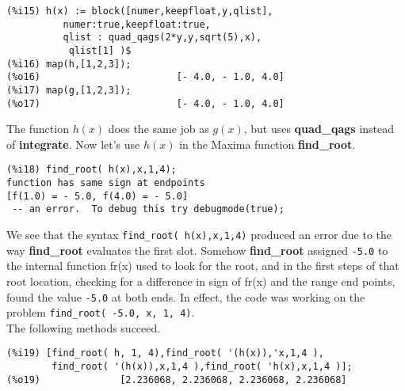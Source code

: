 \documentclass[12pt]{article}
\begin{document}
\small
\begin{verbatim}
(%i15) h(x) := block([numer,keepfloat,y,qlist],
          numer:true,keepfloat:true,
          qlist : quad_qags(2*y,y,sqrt(5),x),
           qlist[1] )$
(%i16) map(h,[1,2,3]);
(%o16)                        [- 4.0, - 1.0, 4.0]
(%i17) map(g,[1,2,3]);
(%o17)                        [- 4.0, - 1.0, 4.0]
\end{verbatim}
\normalsize
The function $h(x)$ does the same job as $g(x)$, but uses \textbf{quad\_qags}
  instead of \textbf{integrate}.
Now let's use $h(x)$ in the Maxima function \textbf{find\_root}.
\small
\begin{verbatim}
(%i18) find_root( h(x),x,1,4);
function has same sign at endpoints
[f(1.0) = - 5.0, f(4.0) = - 5.0]
 -- an error.  To debug this try debugmode(true);
\end{verbatim}
\normalsize
We see that the syntax \verb|find_root( h(x),x,1,4)| produced an error due
  to the way \textbf{find\_root} evaluates the first slot. 
Somehow \textbf{find\_root} assigned \verb|-5.0| to the internal
  function fr(x) used to look for the root, and in the first steps of
  that root location, checking for a difference in sign of fr(x) and the
  range end points, found the value \verb|-5.0| at both ends.
In effect, the code was working on the problem
  \verb|find_root( -5.0, x, 1, 4)|.\\
  
The following methods succeed.
\small
\begin{verbatim}
(%i19) [find_root( h, 1, 4),find_root( '(h(x)),'x,1,4 ),
        find_root( '(h(x)),x,1,4 ),find_root( 'h(x),x,1,4 )];
(%o19)              [2.236068, 2.236068, 2.236068, 2.236068]
\end{verbatim}
\normalsize
\end{document}
